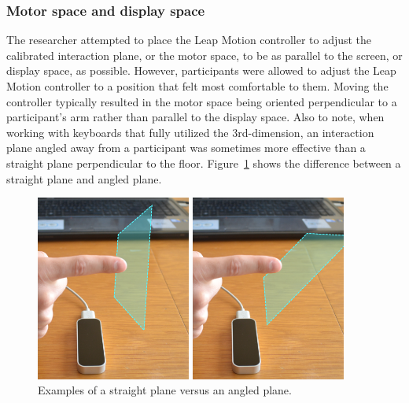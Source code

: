 \subsubsection{Motor space and display space}
The researcher attempted to place the Leap Motion controller to adjust the calibrated interaction plane, or the motor space, to be as parallel to the screen, or display space, as possible. However, participants were allowed to adjust the Leap Motion controller to a position that felt most comfortable to them. Moving the controller typically resulted in the motor space being oriented perpendicular to a participant's arm rather than parallel to the display space. Also to note, when working with keyboards that fully utilized the 3rd-dimension, an interaction plane angled away from a participant was sometimes more effective than a straight plane perpendicular to the floor. Figure~\ref{plane_angle} shows the difference between a straight plane and angled plane.

\begin{figure}[!t]
	\centering
	\begin{minipage}[t]{4in}
		\begin{minipage}[t]{1.9in}
			\includegraphics[width=2in]{Figures/fig_plane_straight}
		\end{minipage}
		\begin{minipage}[t]{1.9in}
			\includegraphics[width=2in]{Figures/fig_plane_angled}
		\end{minipage}
	\end{minipage}
	\caption[Angled Plane]{Examples of a straight plane versus an angled plane.}
	\label{plane_angle}
\end{figure}

